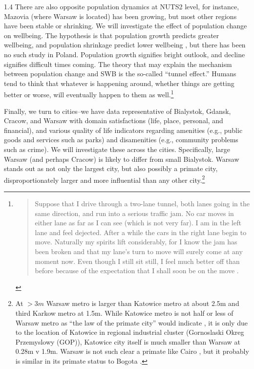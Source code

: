 \documentclass[10pt, letterpaper]{article}
\begin{document}
\begin{spacing}{1.4}
There are also opposite population dynamics at NUTS2 level, for
instance,  Mazovia (where Warsaw is located) has been growing, but most  
other regions have been stable or shrinking. We will investigate the effect of
population change on wellbeing.  The hypothesis is that population growth predicts
greater wellbeing, and population shrinkage predict lower wellbeing
\citep{growShrink25}, but there has been no such study in Poland.
 Population
growth signifies bright outlook, and decline signifies difficult times coming. 
The theory that may explain the mechanism between population change and SWB is  the so-called ``tunnel effect.'' Humans tend to think that
whatever is happening around, whether things are getting better or worse,  will
eventually happen to them as well.\footnote{
 \begin{quote}
  Suppose that I drive through a two-lane tunnel, both lanes going in the same direction, and run
  into a serious traffic jam. No car moves in either lane as far as I can see (which is not very
  far). I am in the left lane and feel dejected. After a while the cars in the right lane begin to
  move. Naturally my spirits lift considerably, for I know the jam has been broken and that my
  lane's turn to move will surely come at any moment now. Even though I still sit still, I feel much
  better off than before because of the expectation that I shall soon
  be on the move \citep[Hirschman, quoted in][p. 88]{ravallion00l}.
\end{quote}%
}

Finally, we turn to cities--we have data representative of 
Bialystok, Gdansk, Cracow, and Warsaw with domain satisfactions (life, place,
personal, and financial), and various quality of life indicators regarding
amenities (e.g., public goods and services such as parks)  and
disamenities (e.g., community problems such as crime). We will investigate 
these across the cities.    
 Specifically, large Warsaw (and perhaps Cracow) is likely to differ from small
 Bialystok. 
 Warsaw stands out as not only the largest city, but also possibly a primate
 city, disproportionately larger and more influential than any other city.\footnote{At
$>3m$ Warsaw metro is larger than Katowice metro at about 2.5m and third
Karkow metro at 1.5m.
While Katowice metro is not half or less of Warsaw metro as
 ``the law of the primate city''
 would indicate \citep[see discussion in][]{aok12zipf}, it is only due to the
 location of Katowice in regional industrial cluster (Gornoslaski Okreg
 Przemyslowy (GOP)), Katowice city itself is much smaller than  Warsaw at
 0.28m v 1.9m. 
 Warsaw is not such clear a primate like Cairo  \citep{ebshoyEgypt24}, but it
 probably is similar in its primate status to Bogota \citep{unhappyBog26}.
}
 

\end{spacing}
\end{document}
